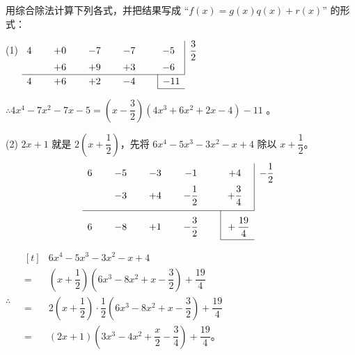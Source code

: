 \liti 用综合除法计算下列各式，并把结果写成 “$f(x) = g(x)q(x) + r(x)$” 的形式：
\begin{xiaoxiaotis}



\end{xiaoxiaotis}

\jie (1) \quad $
\renewcommand\arraystretch{1.2}
\begin{array}[t]{*{4}{c@{\hspace{0.8cm}}}c|l}
    4 & +0 & -7 & -7 & -5 & \dfrac{3}{2} \\
      & +6 & +9 & +3 & -6 &   \\
    \cline{1-5}
    4 & +6 & +2 & -4 & \multicolumn{1}{|r}{ -11 } & \\
    \cline{5-5}
\end{array}
$

$\therefore$\quad $4x^4 - 7x^2 - 7x - 5 = \left( x - \dfrac{3}{2} \right) (4x^3 + 6x^2 + 2x - 4) - 11$ 。


(2)  $2x+1$ 就是 $2 \left( x + \dfrac{1}{2} \right)$，先将 $6x^4 - 5x^3 - 3x^2 - x + 4$ 除以 $x + \dfrac{1}{2}$。
$$
\begin{array}[t]{*{4}{c@{\hspace{0.8cm}}}c|l}
    6 & -5 & -3 &            -1 &            +4 & -\dfrac{1}{2} \\[0.6em]
      & -3 & +4 & -\dfrac{1}{2} & +\dfrac{3}{4} &   \\[0.8em]
    \cline{1-5}
    6 & -8 & +1 & -\dfrac{3}{2} & \multicolumn{1}{|r}{ \rule[-1em]{0pt}{3em} +\dfrac{19}{4} } & \\
    \cline{5-5}
\end{array}
$$

$\therefore \quad \begin{aligned}[t]
        & 6x^4 - 5x^3 - 3x^2 -x + 4 \\
    ={} & \left( x + \dfrac{1}{2} \right) \left( 6x^3 - 8x^2 + x - \dfrac{3}{2} \right) + \dfrac{19}{4} \\
    ={} & 2 \left( x + \dfrac{1}{2} \right) \cdot \dfrac{1}{2} \left( 6x^3 - 8x^2 + x - \dfrac{3}{2} \right) + \dfrac{19}{4} \\
    ={} & (2x + 1) \left( 3x^3 - 4x^2 + \dfrac{x}{2} - \dfrac{3}{4} \right) + \dfrac{19}{4} \text{。}
\end{aligned}$

